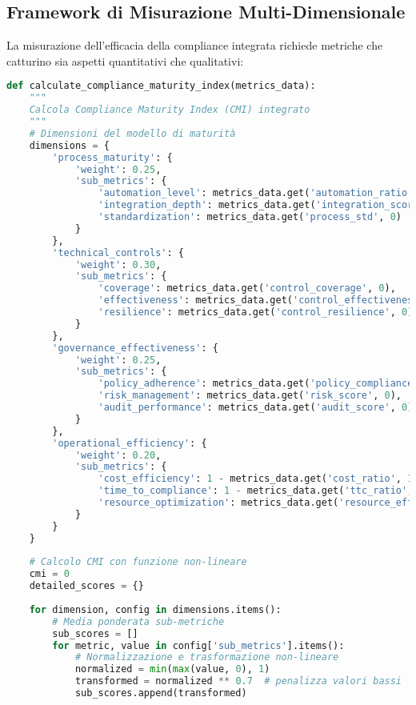 \subsection{Framework di Misurazione Multi-Dimensionale}

La misurazione dell'efficacia della compliance integrata richiede metriche che catturino sia aspetti quantitativi che qualitativi:

\begin{lstlisting}[language=Python, caption=Calcolo Compliance Maturity Index]
def calculate_compliance_maturity_index(metrics_data):
    """
    Calcola Compliance Maturity Index (CMI) integrato
    """
    # Dimensioni del modello di maturità
    dimensions = {
        'process_maturity': {
            'weight': 0.25,
            'sub_metrics': {
                'automation_level': metrics_data.get('automation_ratio', 0),
                'integration_depth': metrics_data.get('integration_score', 0),
                'standardization': metrics_data.get('process_std', 0)
            }
        },
        'technical_controls': {
            'weight': 0.30,
            'sub_metrics': {
                'coverage': metrics_data.get('control_coverage', 0),
                'effectiveness': metrics_data.get('control_effectiveness', 0),
                'resilience': metrics_data.get('control_resilience', 0)
            }
        },
        'governance_effectiveness': {
            'weight': 0.25,
            'sub_metrics': {
                'policy_adherence': metrics_data.get('policy_compliance', 0),
                'risk_management': metrics_data.get('risk_score', 0),
                'audit_performance': metrics_data.get('audit_score', 0)
            }
        },
        'operational_efficiency': {
            'weight': 0.20,
            'sub_metrics': {
                'cost_efficiency': 1 - metrics_data.get('cost_ratio', 1),
                'time_to_compliance': 1 - metrics_data.get('ttc_ratio', 1),
                'resource_optimization': metrics_data.get('resource_eff', 0)
            }
        }
    }
    
    # Calcolo CMI con funzione non-lineare
    cmi = 0
    detailed_scores = {}
    
    for dimension, config in dimensions.items():
        # Media ponderata sub-metriche
        sub_scores = []
        for metric, value in config['sub_metrics'].items():
            # Normalizzazione e trasformazione non-lineare
            normalized = min(max(value, 0), 1)
            transformed = normalized ** 0.7  # penalizza valori bassi
            sub_scores.append(transformed)
            

\end{lstlisting}
